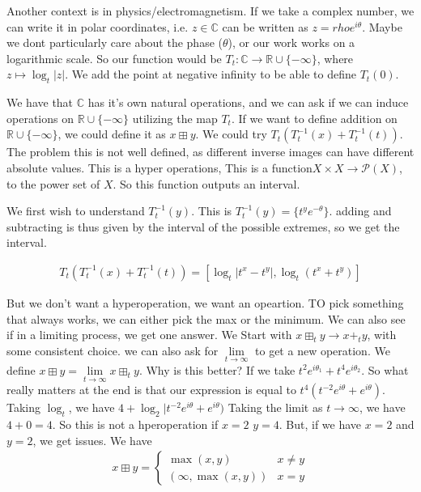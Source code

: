 \documentclass[12pt]{memoir}
\theoremstyle{definition}
\def\RR{{\mathbb R}}
\def\CC{{\mathbb C}}
\begin{document}
Another context is in physics/electromagnetism. If we take a complex number, we can write it in polar coordinates, i.e. $z \in \CC$ can be written as $z = rho e^{i \theta}$. Maybe we dont particularly care about the phase ($\theta$), or our work works on a logarithmic scale. So our function would be $T_t: \CC \rightarrow \RR\cup \{-\infty\}$, where $z \mapsto \log_t|z|$. We add the point at negative infinity to be able to define $T_t(0)$.


We have that $\CC$ has it's own natural operations, and we can ask if we can induce operations on $\RR\cup \{-\infty\}$ utilizing the map $T_t$. If we want to define addition on $\RR\cup\{-\infty\}$, we could define it as $x \boxplus y$. We could try $ T_t( T_t^{-1}(x) + T_t^{-1}(t))$. The problem this is not well defined, as different inverse images can have different absolute values. This is a hyper operations, This is a function$ X \times X \rightarrow \mathcal{P}(X)$, to the power set of $X$. So this function outputs an interval.

We first wish to understand $T_t^{-1}(y)$. This is $T_t^{-1}(y) = \{t^ye^{-\theta}\}$. adding and subtracting is thus given by the interval of the possible extremes, so we get the interval.

\begin{align*}
    T_t( T_t^{-1}(x) + T_t^{-1}(t)) = [ \log_{t} |t^x-t^y|, \log_t(t^x+t^y)]
\end{align*}

But we don't want a hyperoperation, we want an opeartion. TO pick something that always works, we can either pick the max or the minimum. We can also see if in a limiting process, we get one answer.  We Start with $x \boxplus_t y \rightarrow x+_t y$, with some consistent choice. we can also ask for $\lim\limits_{t \rightarrow \infty}$ to get a new operation. We define $x \boxplus y = \lim\limits_{t \rightarrow \infty} x \boxplus_t y$. Why is this better? If we take $t^2e^{i\theta_1} + t^4 e^{i\theta_2}$. So what really matters at the end is that our expression is equal to $t^4(t^{-2}e^{i\theta} +e^{i\theta})$. Taking $\log_t$, we have $4+ \log_2|t^{-2}e^{i\theta} + e^{i\theta})$ Taking the limit as $t \rightarrow \infty$, we have $4+0=4$. So this is not a hperoperation if $x=2$ $y=4$. But, if we have $x=2$ and $y=2$, we get issues. We have
\begin{align*}
    x\boxplus y = \begin{cases}
        \max(x,y) & x \neq y
        \\
        (\infty, \max(x,y) ) & x =y
    \end{cases}
\end{align*}
\end{document}
